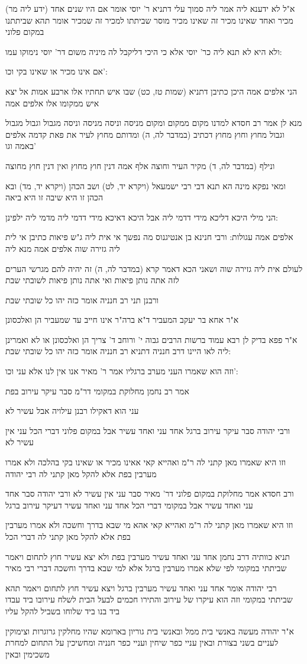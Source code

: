 \documentclass[12pt, openany]{book}
\newcommand{\sethebfont}{
\fontsize{10.5pt}{21.0pt} \selectfont
}
\newcommand{\textblock}[1]{
{\sethebfont #1\\}	
}
\begin{document}
\textblock{(ידע ליה מר) א"ל לא ידענא ליה אמר ליה סמוך עלי דתניא ר' יוסי אומר אם היו שנים אחד מכיר ואחד שאינו מכיר זה שאינו מכיר מוסר שביתתו למכיר זה שמכיר אומר תהא שביתתנו במקום פלוני}
\textblock{ולא היא לא תנא ליה כר' יוסי אלא כי היכי דליקבל לה מיניה משום דר' יוסי נימוקו עמו:}
\textblock{אם אינו מכיר או שאינו בקי וכו':}
\textblock{הני אלפים אמה היכן כתיבן דתניא (שמות טז, כט) שבו איש תחתיו אלו ארבע אמות אל יצא איש ממקומו אלו אלפים אמה}
\textblock{מנא לן אמר רב חסדא למדנו מקום ממקום ומקום מניסה וניסה מניסה וניסה מגבול וגבול מגבול וגבול מחוץ וחוץ מחוץ דכתיב (במדבר לה, ה) ומדותם מחוץ לעיר את פאת קדמה אלפים באמה וגו'}
\textblock{ונילף (במדבר לה, ד) מקיר העיר וחוצה אלף אמה דנין חוץ מחוץ ואין דנין חוץ מחוצה}
\textblock{ומאי נפקא מינה הא תנא דבי רבי ישמעאל (ויקרא יד, לט) ושב הכהן (ויקרא יד, מד) ובא הכהן זו היא שיבה זו היא ביאה}
\textblock{הני מילי היכא דליכא מידי דדמי ליה אבל היכא דאיכא מידי דדמי ליה מדמי ליה ילפינן:}
\textblock{אלפים אמה עגולות: ורבי חנינא בן אנטיגנוס מה נפשך אי אית ליה ג"ש פיאות כתיבן אי לית ליה גזירה שוה אלפים אמה מנא ליה}
\textblock{לעולם אית ליה גזירה שוה ושאני הכא דאמר קרא (במדבר לה, ה) זה יהיה להם מגרשי הערים לזה אתה נותן פיאות ואי אתה נותן פיאות לשובתי שבת}
\textblock{ורבנן תני רב חנניה אומר כזה יהו כל שובתי שבת}
\textblock{א"ר אחא בר יעקב המעביר ד"א ברה"ר אינו חייב עד שמעביר הן ואלכסונן}
\textblock{א"ר פפא בדיק לן רבא עמוד ברשות הרבים גבוה י' ורוחב ד' צריך הן ואלכסונן או לא ואמרינן ליה לאו היינו דרב חנניה דתניא רב חנניה אומר כזה יהו כל שובתי שבת:}
\textblock{וזה הוא שאמרו העני מערב ברגליו אמר ר' מאיר אנו אין לנו אלא עני וכו':}
\textblock{אמר רב נחמן מחלוקת במקומי דר"מ סבר עיקר עירוב בפת}
\textblock{עני הוא דאקילו רבנן עילויה אבל עשיר לא}
\textblock{ורבי יהודה סבר עיקר עירוב ברגל אחד עני ואחד עשיר אבל במקום פלוני דברי הכל עני אין עשיר לא}
\textblock{וזו היא שאמרו מאן קתני לה ר"מ ואהייא קאי אאינו מכיר או שאינו בקי בהלכה ולא אמרו מערבין בפת אלא להקל מאן קתני לה רבי יהודה}
\textblock{ורב חסדא אמר מחלוקת במקום פלוני דר' מאיר סבר עני אין עשיר לא ורבי יהודה סבר אחד עני ואחד עשיר אבל במקומי דברי הכל אחד עני ואחד עשיר דעיקר עירוב ברגל}
\textblock{וזו היא שאמרו מאן קתני לה ר"מ ואהייא קאי אהא מי שבא בדרך וחשכה ולא אמרו מערבין בפת אלא להקל מאן קתני לה דברי הכל}
\textblock{תניא כוותיה דרב נחמן אחד עני ואחד עשיר מערבין בפת ולא יצא עשיר חוץ לתחום ויאמר שביתתי במקומי לפי שלא אמרו מערבין ברגל אלא למי שבא בדרך וחשכה דברי רבי מאיר}
\textblock{רבי יהודה אומר אחד עני ואחד עשיר מערבין ברגל ויצא עשיר חוץ לתחום ויאמר תהא שביתתי במקומי וזה הוא עיקרו של עירוב והתירו חכמים לבעל הבית לשלח עירובו ביד עבדו ביד בנו ביד שלוחו בשביל להקל עליו}
\textblock{א"ר יהודה מעשה באנשי בית ממל ובאנשי בית גוריון בארומא שהיו מחלקין גרוגרות וצימוקין לעניים בשני בצורת ובאין עניי כפר שיחין ועניי כפר חנניה ומחשיכין על התחום למחרת משכימין ובאין}
\end{document}
